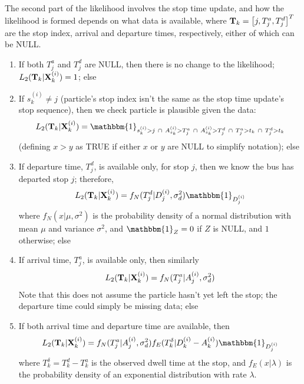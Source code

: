 \documentclass[draftcls,a4paper,onecolumn]{IEEEtran}\usepackage[]{graphicx}\usepackage[]{color}
\begin{document}
The second part of the likelihood involves the stop time update,
and how the likelihood is formed depends on what data is available,
where $\mathbf{T}_k = \left[ j, T^a_j , T^d_j \right]^T$ 
are the stop index, arrival and departure times,
respectively, either of which can be NULL.

\begin{enumerate}
\item 
  If both $T^a_j$ and $T^d_j$ are NULL, 
  then there is no change to the likelihood;
  $ L_2  (\mathbf{T}_k | \mathbf{X}_k^{(i)}) = 1 $; else
  
\item
  If $s_k^{(i)} \neq j$ (particle's stop index isn't the same as the stop time update's stop sequence),
  then we check particle is plausible given the data:
  \begin{equation}
    \label{eq:l2a}
    L_2 (\bT_k | \bX_k^{(i)}) =
    \mathbbm{1}_{s_k^{(i)} > j\ \cap\ A_{s_k}^{(i)} > T_j^a\ \cap\ A_{s_k}^{(i)} > T_j^d\
      \cap\ T^a_j > t_k\ \cap\ T^d_j > t_k}
  \end{equation}
  (defining $x > y$ as TRUE if either $x$ or $y$ are NULL to simplify notation); else
  

\item
  If departure time, $T^d_j$, is available only, for stop $j$, then we
  know the bus has departed stop $j$; therefore,
  \begin{equation}
    \label{eq:l2}
    L_2 (\bT_k | \bX_k^{(i)}) =
        f_N(T_j^d | D_j^{(i)}, \sigma_d^2) \mathbbm{1}_{D_j^{(i)}}
  \end{equation}
  where $f_N(x | \mu, \sigma^2)$ is the probability density of a normal distribution
  with mean $\mu$ and variance $\sigma^2$,
  and $\mathbbm{1}_Z = 0$ if $Z$ is NULL, and $1$ otherwise; else
  
\item
  If arrival time, $T^a_j$, is available only, then similarly
  \begin{equation}
    \label{eq:l2b}
    L_2  (\mathbf{T}_k | \mathbf{X}_k^{(i)}) =
      f_N(T_j^a | A_j^{(i)}, \sigma_d^2)
  \end{equation}
  Note that this does not assume the particle hasn't yet left the stop;
  the departure time could simply be missing data; else
  
\item
  If both arrival time and departure time are available, then
  \begin{equation}
    \label{eq:l2c}
    L_2  (\bT_k | \bX_k^{(i)}) =
        f_N(T_j^a| A_j^{(i)}, \sigma_d^2) f_E(T_k^\delta | D_k^{(i)} - A_k^{(i)}) \mathbbm{1}_{D_j^{(i)}}
  \end{equation}
  where $T_k^\delta = T_k^d - T_k^a$ is the observed dwell time at the stop,
  and $f_E(x | \lambda)$ is the probability density of an exponential distribution 
  with rate $\lambda$.
  
\end{enumerate}
\end{document}
